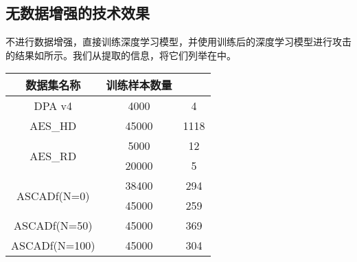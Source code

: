 {%
%	
	\subsection{无数据增强的技术效果}
	不进行数据增强，直接训练深度学习模型，并使用训练后的深度学习模型进行攻击的结果如所示。我们从提取\chenggongtiaoshu 的信息，将它们列举在中。
	
	\begin{table}[!h]
		\label{tab:originmtd}
		\centering
		\begin{tabular}{c|cc}
			\hline
			数据集名称&训练样本数量&\chenggongtiaoshu \\
			\hline
			DPA v4    &4000&4\\
			\hline
			AES\_HD   &45000&1118\\
			\hline
			\multirow{2}{*}{AES\_RD}
			&5000&12\\
			&20000&5\\
			\hline
			\multirow{2}{*}{ASCADf(N=0)}
			&38400&294\\
			&45000&259\\
			\hline
			ASCADf(N=50)&45000&369\\
			\hline
			ASCADf(N=100)&45000&304\\
			\hline
		\end{tabular}
	\end{table}

}
